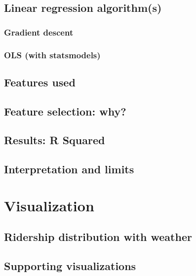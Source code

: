 \documentclass[letterpaper,10pt,english]{sphinxmanual}
\begin{document}
\section{Linear regression algorithm(s)}
\label{section2:linear-regression-algorithm-s}

\subsection{Gradient descent}
\label{section2:gradient-descent}

\subsection{OLS (with statsmodels)}
\label{section2:ols-with-statsmodels}

\section{Features used}
\label{section2:features-used}

\section{Feature selection: why?}
\label{section2:feature-selection-why}

\section{Results: R Squared}
\label{section2:results-r-squared}

\section{Interpretation and limits}
\label{section2:interpretation-and-limits}

\chapter{Visualization}
\label{section3:visualization}\label{section3::doc}

\section{Ridership distribution with weather}
\label{section3:ridership-distribution-with-weather}

\section{Supporting visualizations}
\label{section3:supporting-visualizations}
\end{document}
